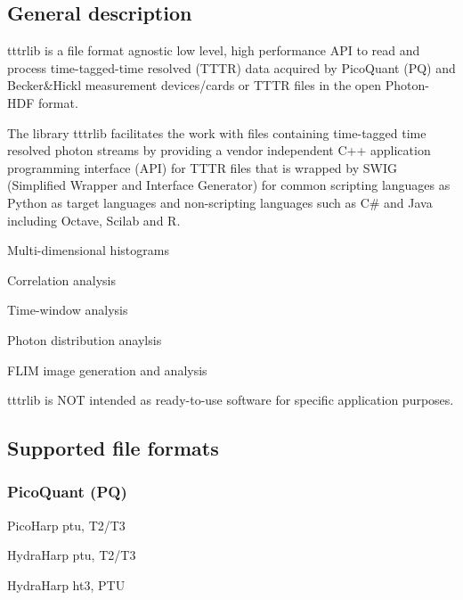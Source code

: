 \href{https://travis-ci.org/tpeulen/tttrlib}{\tt } \href{https://anaconda.org/tpeulen/tttrlib}{\tt } \href{https://anaconda.org/tpeulen/tttrlib}{\tt } \href{https://www.codacy.com?utm_source=github.com&amp;utm_medium=referral&amp;utm_content=tpeulen/tttrlib&amp;utm_campaign=Badge_Grade}{\tt }

\subsection*{General description}

tttrlib is a file format agnostic low level, high performance A\+PI to read and process time-\/tagged-\/time resolved (T\+T\+TR) data acquired by Pico\+Quant (PQ) and Becker\&Hickl measurement devices/cards or T\+T\+TR files in the open Photon-\/\+H\+DF format.

The library tttrlib facilitates the work with files containing time-\/tagged time resolved photon streams by providing a vendor independent C++ application programming interface (A\+PI) for T\+T\+TR files that is wrapped by S\+W\+IG (Simplified Wrapper and Interface Generator) for common scripting languages as Python as target languages and non-\/scripting languages such as C\# and Java including Octave, Scilab and R.


\begin{DoxyItemize}
\item Multi-\/dimensional histograms
\item Correlation analysis
\item Time-\/window analysis
\item Photon distribution anaylsis
\item F\+L\+IM image generation and analysis
\end{DoxyItemize}



tttrlib is N\+OT intended as ready-\/to-\/use software for specific application purposes.

\subsection*{Supported file formats}

\subsubsection*{Pico\+Quant (PQ)}


\begin{DoxyItemize}
\item Pico\+Harp ptu, T2/\+T3
\item Hydra\+Harp ptu, T2/\+T3
\item Hydra\+Harp ht3, P\+TU
\end{DoxyItemize}


